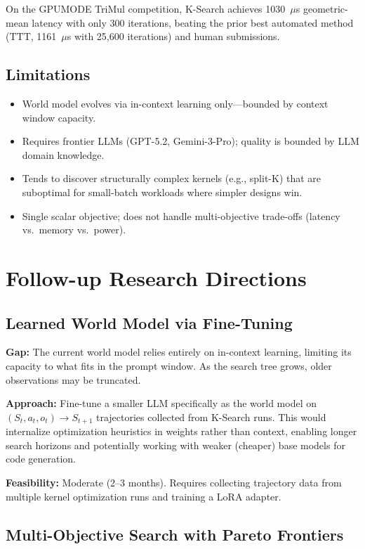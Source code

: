 \documentclass[11pt]{article}
\begin{document}
On the GPUMODE TriMul competition, K-Search achieves 1030~$\mu$s geometric-mean latency with only 300 iterations, beating the prior best automated method (TTT, 1161~$\mu$s with 25{,}600 iterations) and human submissions.

\subsection{Limitations}

\begin{itemize}
    \item World model evolves via in-context learning only---bounded by context window capacity.
    \item Requires frontier LLMs (GPT-5.2, Gemini-3-Pro); quality is bounded by LLM domain knowledge.
    \item Tends to discover structurally complex kernels (e.g., split-K) that are suboptimal for small-batch workloads where simpler designs win.
    \item Single scalar objective; does not handle multi-objective trade-offs (latency vs.\ memory vs.\ power).
\end{itemize}

\section{Follow-up Research Directions}

\subsection{Learned World Model via Fine-Tuning}

\textbf{Gap:} The current world model relies entirely on in-context learning, limiting its capacity to what fits in the prompt window. As the search tree grows, older observations may be truncated.

\textbf{Approach:} Fine-tune a smaller LLM specifically as the world model on $(S_t, a_t, o_t) \to S_{t+1}$ trajectories collected from K-Search runs. This would internalize optimization heuristics in weights rather than context, enabling longer search horizons and potentially working with weaker (cheaper) base models for code generation.

\textbf{Feasibility:} Moderate (2--3 months). Requires collecting trajectory data from multiple kernel optimization runs and training a LoRA adapter.

\subsection{Multi-Objective Search with Pareto Frontiers}
\end{document}
